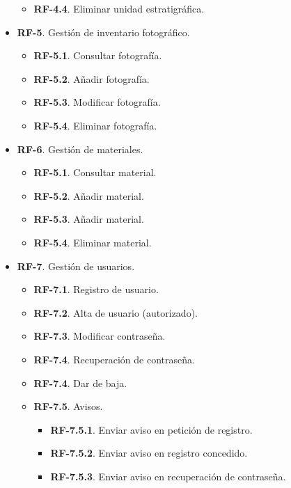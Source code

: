 \begin{itemize}
\begin{itemize}
                \item \textbf{RF-4.4}. Eliminar unidad estratigráfica.          
            \end{itemize}
        \item \textbf{RF-5}. Gestión de inventario fotográfico.
            \begin{itemize}
                \item \textbf{RF-5.1}. Consultar fotografía.
                \item \textbf{RF-5.2}. Añadir fotografía.
                \item \textbf{RF-5.3}. Modificar fotografía.
                \item \textbf{RF-5.4}. Eliminar fotografía.    
            \end{itemize}
        \item \textbf{RF-6}. Gestión de materiales.
            \begin{itemize}
                \item \textbf{RF-5.1}. Consultar material.
                \item \textbf{RF-5.2}. Añadir material.
                \item \textbf{RF-5.3}. Añadir material.
                \item \textbf{RF-5.4}. Eliminar material.    
            \end{itemize}
        \item \textbf{RF-7}. Gestión de usuarios.
            \begin{itemize}
                \item \textbf{RF-7.1}. Registro de usuario.
                \item \textbf{RF-7.2}. Alta de usuario (autorizado).
                \item \textbf{RF-7.3}. Modificar contraseña.
                \item \textbf{RF-7.4}. Recuperación de contraseña.
                \item \textbf{RF-7.4}. Dar de baja.
                \item \textbf{RF-7.5}. Avisos.
                    \begin{itemize}
                        \item \textbf{RF-7.5.1}. Enviar aviso en petición de registro.
                        \item \textbf{RF-7.5.2}. Enviar aviso en registro concedido.
                        \item \textbf{RF-7.5.3}. Enviar aviso en recuperación de contraseña.

\end{itemize}
\end{itemize}
\end{itemize}
